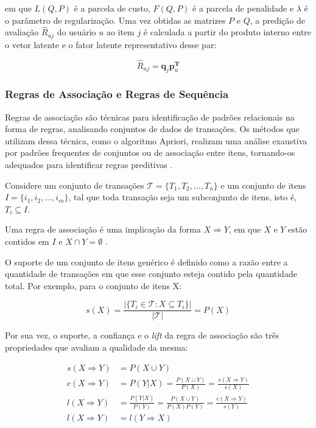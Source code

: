 em que $L(Q,P)$ é a parcela de custo, $F(Q,P)$ é a parcela de penalidade e
$\lambda$ é o parâmetro de regularização. Uma vez obtidas as matrizes $P$ e $Q$,
a predição de avaliação $\hat{R}_{uj}$ do usuário $u$ ao item $j$ é calculada a
partir do produto interno entre o vetor latente e o fator latente representativo
desse par:

\begin{equation} \label{fator_latente}
    \hat{R}_{uj} = \mathbf{q}_j \mathbf{p}_u^{\mathbf{T}}
\end{equation}

\subsubsection{Regras de Associação e Regras de Sequência}
Regras de associação são técnicas para identificação de padrões relacionais
na forma de regras, analisando conjuntos de dados de transações. Os métodos que
utilizam dessa técnica, como o algoritmo Apriori, realizam uma análise exaustiva
por padrões frequentes de conjuntos ou de associação entre itens, tornando-os
adequados para identificar regras preditivas \cite{jannach2011recommender}.

Considere um conjunto de transações $\mathcal{T} = \{T_1, T_2, \dots, T_n\}$ e
um conjunto de itens $I = \{i_1, i_2, \dots, i_m\}$, tal que toda transação seja
um subconjunto de itens, isto é, $T_i \subseteq I$.

Uma regra de associação é uma
implicação da forma $X \Rightarrow Y$, em que $X$ e $Y$ estão contidos em $I$ e
$X \cap Y = \emptyset$ \cite{ordonez2011evaluating}.

O suporte de um conjunto de itens genérico é definido como a razão entre a
quantidade de transações em que esse conjunto esteja contido pela quantidade
total. Por exemplo, para o conjunto de itens X:

\begin{equation}
s(X) = \frac{|\{T_i \in \mathcal{T} : X \subseteq T_i\}|}{|\mathcal{T}|} = P(X)
\end{equation}

Por sua vez, o suporte, a confiança e o \textit{lift} da regra de associação são três
propriedades que avaliam a qualidade da mesma:

\begin{align}
    s(X \Rightarrow Y) &= P( X \cup Y ) \\
    c(X \Rightarrow Y) &= P(Y|X) = \frac{P(X \cup Y)}{P(X)} = \frac{s(X \Rightarrow Y)}{s(X)}  \\
    l(X \Rightarrow Y) &= \frac{P(Y|X)}{P(Y)} = \frac{P(X \cup Y)}{P(X)P(Y)} = \frac{c(X \Rightarrow Y)}{s(Y)}\\
    l(X \Rightarrow Y) &= l(Y \Rightarrow X) 
\end{align}

